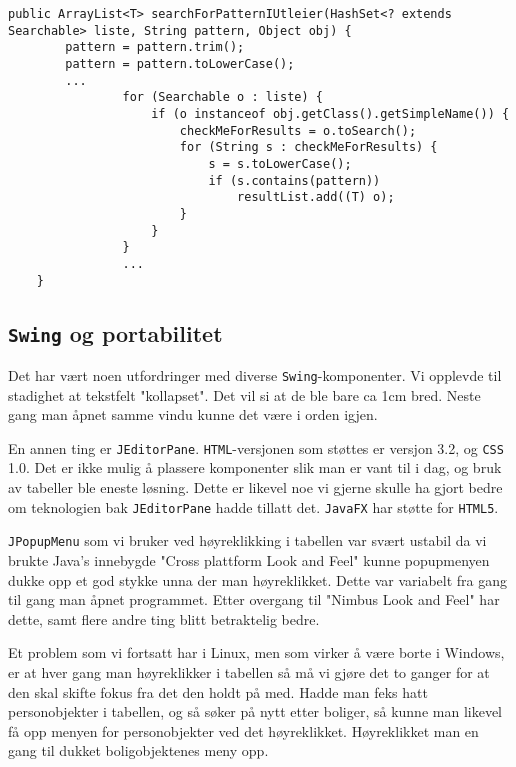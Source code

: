 \begin{lstlisting}[caption=Problem med å teste for objekttype., label=kode:objekttype]
    public ArrayList<T> searchForPatternIUtleier(HashSet<? extends Searchable> liste, String pattern, Object obj) {
        pattern = pattern.trim();
        pattern = pattern.toLowerCase();
        ...
                for (Searchable o : liste) {
                    if (o instanceof obj.getClass().getSimpleName()) {
                        checkMeForResults = o.toSearch();
                        for (String s : checkMeForResults) {
                            s = s.toLowerCase();
                            if (s.contains(pattern))
                                resultList.add((T) o);
                        }
                    }
                }     
                ...
    }
\end{lstlisting}




\subsection{\texttt{Swing} og portabilitet} \label{subsec:portabilitet}
Det har vært noen utfordringer med diverse \texttt{Swing}-komponenter. Vi opplevde til stadighet at tekstfelt "kollapset". Det vil si at de ble bare ca 1cm bred. Neste gang man åpnet samme vindu kunne det være i orden igjen. 

En annen ting er \texttt{JEditorPane}. \texttt{HTML}-versjonen som støttes er versjon 3.2, og \texttt{CSS} 1.0. 
Det er ikke mulig å plassere komponenter slik man er vant til i dag, og bruk av tabeller ble eneste løsning. Dette er likevel noe vi gjerne skulle ha gjort bedre om teknologien bak \texttt{JEditorPane} hadde tillatt det. \texttt{JavaFX} har støtte for \texttt{HTML5}.

\texttt{JPopupMenu} som vi bruker ved høyreklikking i tabellen var svært ustabil da vi brukte Java's innebygde "Cross plattform Look and Feel" kunne popupmenyen dukke opp et god stykke unna der man høyreklikket. Dette var variabelt fra gang til gang man åpnet programmet. Etter overgang til "Nimbus Look and Feel" har dette, samt flere andre ting blitt betraktelig bedre.

Et problem som vi fortsatt har i Linux, men som virker å være borte i Windows, er at hver gang man høyreklikker i tabellen så må vi gjøre det to ganger for at den skal skifte fokus fra det den holdt på med. Hadde man feks hatt personobjekter i tabellen, og så søker på nytt etter boliger, så kunne man likevel få opp menyen for personobjekter ved det høyreklikket. Høyreklikket man en gang til dukket boligobjektenes meny opp.

